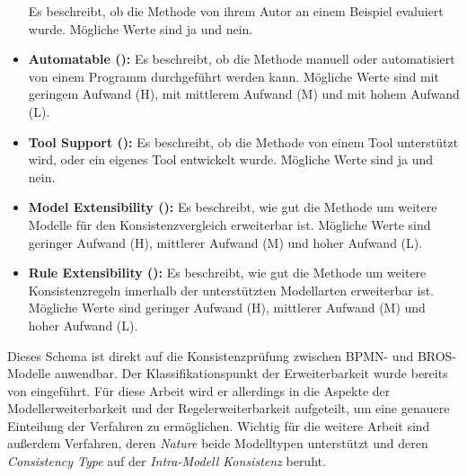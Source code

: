 \begin{itemize}
    Es beschreibt, ob die Methode von ihrem Autor an einem Beispiel evaluiert wurde.
    Mögliche Werte sind ja und nein. 
    \item \textbf{Automatable (\cite{Usman2008}):}
    Es beschreibt, ob die Methode manuell oder automatisiert von einem Programm durchgeführt werden kann.
    Mögliche Werte sind mit geringem Aufwand (H), mit mittlerem Aufwand (M) und mit hohem Aufwand (L).
    \item \textbf{Tool Support (\cite{Usman2008}):}
    Es beschreibt, ob die Methode von einem Tool unterstützt wird, oder ein eigenes Tool entwickelt wurde.
    Mögliche Werte sind ja und nein.
    \item \textbf{Model Extensibility (\cite{Lucas2009}):}
    Es beschreibt, wie gut die Methode um weitere Modelle für den Konsistenzvergleich erweiterbar ist.
    Mögliche Werte sind geringer Aufwand (H), mittlerer Aufwand (M) und hoher Aufwand (L).
    \item \textbf{Rule Extensibility (\cite{Lucas2009}):}
    Es beschreibt, wie gut die Methode um weitere Konsistenzregeln innerhalb der unterstützten Modellarten erweiterbar ist.
    Mögliche Werte sind geringer Aufwand (H), mittlerer Aufwand (M) und hoher Aufwand (L).
\end{itemize}


Dieses Schema ist direkt auf die Konsistenzprüfung zwischen BPMN- und BROS-Modelle anwendbar.
Der Klassifikationspunkt der Erweiterbarkeit wurde bereits von \cite{Lucas2009} eingeführt.
Für diese Arbeit wird er allerdings in die Aspekte der Modellerweiterbarkeit und der Regelerweiterbarkeit aufgeteilt, um eine genauere Einteilung der Verfahren zu ermöglichen.
Wichtig für die weitere Arbeit sind außerdem Verfahren, deren \emph{Nature} beide Modelltypen unterstützt und deren \emph{Consistency Type} auf der \emph{Intra-Modell Konsistenz} beruht.

